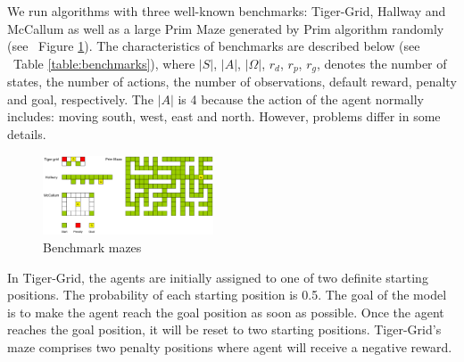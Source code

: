 \documentclass[conference]{IEEEtran}
\begin{document}
	We run algorithms with three well-known benchmarks: Tiger-Grid, Hallway and McCallum 
	as well as a large Prim Maze generated by Prim algorithm randomly
	(see ~Figure \ref{fig:mazes}). The characteristics of benchmarks are described
	below (see ~Table \ref{table:benchmarks}), where $|S|$, $|A|$, $|\Omega|$, $r_d$, $r_p$, $r_g$, 
	denotes the number of states, the number of actions, the number of observations, default
	reward, penalty and goal, respectively. The $|A|$ is 4 because the action of the agent
	normally includes: moving south, west, east and north. However, problems differ in some
	details.
	
	\begin{figure}[h]
		\centering
		\includegraphics[width=0.45\textwidth]{mazes.png}
		\caption{Benchmark mazes}
		\label{fig:mazes}
	\end{figure}
	
	
	In Tiger-Grid, the agents are initially assigned to one of two definite starting positions.
	The probability of each starting position is 0.5. The goal of the model is to make the agent
	reach the goal position as soon as possible. Once the agent reaches the goal position,
	it will be reset to two starting positions. Tiger-Grid's maze comprises two penalty positions
	where agent will receive a negative reward. 
	
\end{document}
